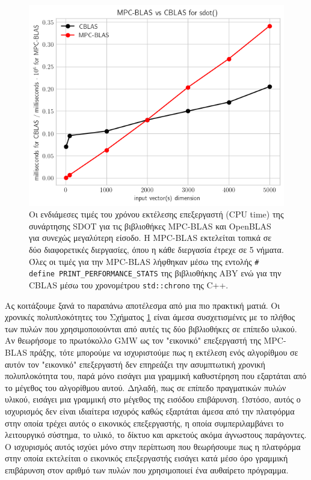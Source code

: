 \begin{figure}[h]
    \centering
    \includegraphics{"./02_postamble/images/mpc-blas-timings-graph.png"}
    \caption[Οι ενδιάμεσες τιμές του χρόνου εκτέλεσης επεξεργαστή (CPU time) της συνάρτησης SDOT για τις βιβλιοθήκες MPC-BLAS και OpenBLAS για συνεχώς μεγαλύτερη είσοδο]{Οι ενδιάμεσες τιμές του χρόνου εκτέλεσης επεξεργαστή (CPU time) της συνάρτησης SDOT για τις βιβλιοθήκες MPC-BLAS και OpenBLAS για συνεχώς μεγαλύτερη είσοδο. Η MPC-BLAS εκτελείται τοπικά σε δύο διαφορετικές διεργασίες, όπου η κάθε διεργασία έτρεχε σε 5 νήματα. Όλες οι τιμές για την MPC-BLAS λήφθηκαν μέσω της εντολής \texttt{# define PRINT_PERFORMANCE_STATS} της βιβλιοθήκης ABY ενώ για την CBLAS μέσω του χρονομέτρου \texttt{std::chrono} της C++.}
    \label{fig:mpc-blas-timings-graph}
\end{figure}

Ας κοιτάξουμε ξανά το παραπάνω αποτέλεσμα από μια πιο πρακτική ματιά. Οι χρονικές πολυπλοκότητες του Σχήματος \ref{fig:mpc-blas-timings-graph} είναι άμεσα συσχετισμένες με το πλήθος των πυλών που χρησιμοποιούνται από αυτές τις δύο βιβλιοθήκες σε επίπεδο υλικού. Αν θεωρήσομε το πρωτόκολλο GMW ως τον "εικονικό" επεξεργαστή της MPC-BLAS πράξης, τότε μπορούμε να ισχυριστούμε πως η εκτέλεση ενός αλγορίθμου σε αυτόν τον "εικονικό" επεξεργαστή δεν επηρεάζει την ασυμπτωτική χρονική πολυπλοκότητα του, παρά μόνο εισάγει μια γραμμική καθυστέρηση που εξαρτάται από το μέγεθος του αλγορίθμου αυτού. Δηλαδή, πως σε επίπεδο πραγματικών πυλών υλικού, εισάγει μια γραμμική στο μέγεθος της εισόδου επιβάρυνση. Ωστόσο, αυτός ο ισχυρισμός δεν είναι ιδιαίτερα ισχυρός καθώς εξαρτάται άμεσα από την πλατφόρμα στην οποία τρέχει αυτός ο εικονικός επεξεργαστής, η οποία συμπεριλαμβάνει το λειτουργικό σύστημα, το υλικό, το δίκτυο και αρκετούς ακόμα άγνωστους παράγοντες. Ο ισχυρισμός αυτός ισχύει μόνο στην περίπτωση που θεωρήσουμε πως η πλατφόρμα στην οποία εκτελείται ο εικονικός επεξεργαστής εισάγει κατά μέσο όρο γραμμική επιβάρυνση στον αριθμό των πυλών που χρησιμοποιεί ένα αυθαίρετο πρόγραμμα.